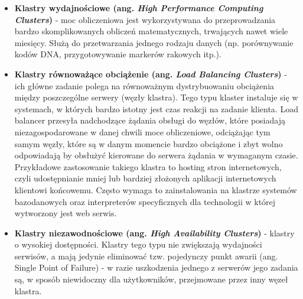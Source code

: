 \documentclass[10pt,a4paper,titlepage,twoside]{report}
\begin{document}
\begin{itemize}
	\item \textbf{Klastry wydajnościowe (ang. \textit{High Performance Computing Clusters})} - moc obliczeniowa jest wykorzystywana do przeprowadzania bardzo skomplikowanych obliczeń matematycznych, trwających nawet wiele miesięcy. Służą do przetwarzania jednego rodzaju danych (np. porównywanie kodów DNA, przygotowywanie markerów rakowych itp.).
	\item \textbf{Klastry równoważące obciążenie (ang. \textit{Load Balancing Clusters})} - ich główne zadanie polega na równoważnym dystrybuowaniu obciążenia między poszczególne serwery  (węzły klastra). Tego typu klaster instaluje się w systemach, w których bardzo istotny jest czas reakcji na zadanie klienta. Load balancer przesyła nadchodzące żądania obsługi do węzłów, które posiadają niezagospodarowane w danej chwili moce obliczeniowe, odciążając tym samym węzły, które są w danym momencie bardzo obciążone i zbyt wolno odpowiadają by obsłużyć kierowane do serwera żądania w wymaganym czasie. Przykładowe zastosowanie takiego klastra to hosting stron internetowych, czyli udostępnianie mniej lub bardziej złożonych aplikacji internetowych klientowi końcowemu. Często wymaga to zainstalowania na klastrze systemów bazodanowych oraz interpreterów specyficznych dla technologii w której wytworzony jest web serwis.
	\item \textbf{Klastry niezawodnościowe (ang. \textit{High Availability Clusters})} - klastry o wysokiej dostępności. Klastry tego typu nie zwiększają wydajności serwisów, a mają jedynie eliminować tzw. pojedynczy punkt awarii (ang. Single Point of Failure) - w razie uszkodzenia jednego z serwerów jego zadania są, w sposób niewidoczny dla użytkowników, przejmowane przez inny węzeł klastra.
\end{itemize}
\end{document}
